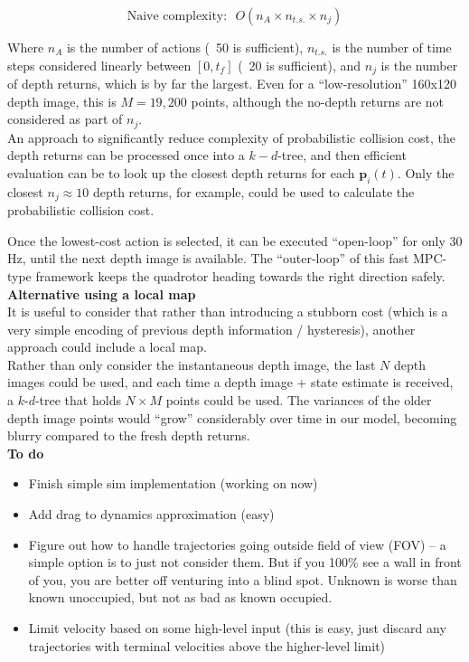 \documentclass[paper=a4, fontsize=11pt]{scrartcl} %
\numberwithin{equation}{section} %
\numberwithin{figure}{section} %
\numberwithin{table}{section} %
\begin{document}
$$\text{Naive complexity:} \ \ \ O( n_{A} \times n_{t.s.} \times n_{j})$$

Where $n_A$ is the number of actions (~50 is sufficient), $n_{t.s.}$ is the number of time steps considered linearly between $[0, t_f]$ (~20 is sufficient), and $n_{j}$ is the number of depth returns, which is by far the largest.  Even for a ``low-resolution'' 160x120 depth image, this is $M=19,200$ points, although the no-depth returns are not considered as part of $n_j$.\\

An approach to significantly reduce complexity of probabilistic collision cost, the depth returns can be processed once into a $k-d$-tree, and then efficient evaluation can be to look up the closest depth returns for each $\mathbf{p}_i(t)$.  Only the closest $n_j \approx 10$ depth returns, for example, could be used to calculate the probabilistic collision cost.

Once the lowest-cost action is selected, it can be executed ``open-loop'' for only 30 Hz, until the next depth image is available.  The ``outer-loop'' of this fast MPC-type framework keeps the quadrotor heading towards the right direction safely.\\

\textbf{Alternative using a local map}
\\

It is useful to consider that rather than introducing a stubborn cost (which is a very simple encoding of previous depth information / hysteresis), another approach could include a local map.\\

Rather than only consider the instantaneous depth image, the last $N$ depth images could be used, and each time a depth image + state estimate is received, a $k$-$d$-tree that holds $N \times M$ points could be used.  The variances of the older depth image points would ``grow'' considerably over time in our model, becoming blurry compared to the fresh depth returns.  \\

\textbf{To do}
\\
\begin{itemize}
\item Finish simple sim implementation (working on now)
\item Add drag to dynamics approximation (easy)
\item Figure out how to handle trajectories going outside field of view (FOV) -- a simple option is to just not consider them.  But if you 100\% see a wall in front of you, you are better off venturing into a blind spot.  Unknown is worse than known unoccupied, but not as bad as known occupied.
\item Limit velocity based on some high-level input (this is easy, just discard any trajectories with terminal velocities above the higher-level limit)
\end{itemize}
\end{document}
